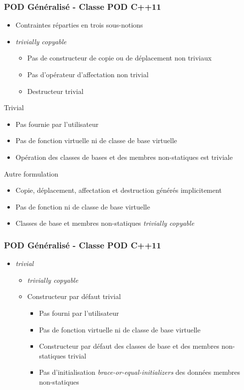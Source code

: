 \documentclass[C++.tex]{subfiles}
\begin{document}
\begin{frame}[fragile]
	\frametitle{POD Généralisé - Classe POD C++11}
	\begin{itemize}
		\item Contraintes réparties en trois sous-notions
		\item \textit{trivially copyable}
		\begin{itemize}
			\item Pas de constructeur de copie ou de déplacement non triviaux
			\item Pas d'opérateur d'affectation non trivial
			\item Destructeur trivial
		\end{itemize}
	\end{itemize}

	\pause

	\begin{block}{Trivial}
		\begin{itemize}
			\item Pas fournie par l'utilisateur
			\item Pas de fonction virtuelle ni de classe de base virtuelle
			\item Opération des classes de bases et des membres non-statiques est triviale
		\end{itemize}
	\end{block}

	\pause

	\begin{block}{Autre formulation}
		\begin{itemize}
			\item Copie, déplacement, affectation et destruction générés implicitement
			\item Pas de fonction ni de classe de base virtuelle
			\item Classes de base et membres non-statiques \textit{trivially copyable}
		\end{itemize}
	\end{block}
\end{frame}

\begin{frame}[fragile]
	\frametitle{POD Généralisé - Classe POD C++11}
	\begin{itemize}
		\item \textit{trivial}
		\begin{itemize}
			\item \textit{trivially copyable}
			\item Constructeur par défaut trivial
			\begin{itemize}
				\item Pas fourni par l'utilisateur
				\item Pas de fonction virtuelle ni de classe de base virtuelle
				\item Constructeur par défaut des classes de base et des membres non-statiques trivial
				\item Pas d'initialisation \textit{brace-or-equal-initializers} des données membres non-statiques
			\end{itemize}
		\end{itemize}
	\end{itemize}
\end{frame}
\end{document}
